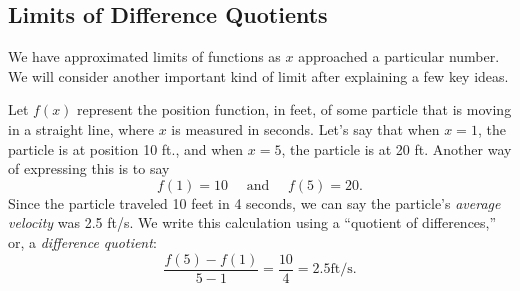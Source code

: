 \subsection{Limits of Difference Quotients}


We have approximated limits of functions as $x$ approached a particular number. We will consider another important kind of limit after explaining a few key ideas.

Let $f(x)$ represent the position function, in feet, of some particle that is moving in a straight line, where $x$ is measured in seconds. Let's say that when $x=1$, the particle is at position 10 ft., and when $x=5$, the particle is at 20 ft. Another way of expressing this is to say
\[f(1)=10 \quad \text{ and } \quad f(5) = 20.\]
Since the particle traveled 10 feet in 4 seconds, we can say the particle's \emph{average velocity} was 2.5 ft/s. We write this calculation using a ``quotient of differences,'' or, a \emph{difference quotient}:
\[\frac{f(5) - f(1)}{5-1} = \frac{10}4 = 2.5 \text{ft/s}.\]

